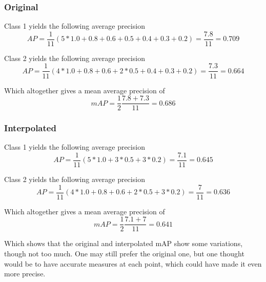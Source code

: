 \subsubsection*{Original}

Class 1 yields the following average precision
\begin{equation*}
    AP = \frac{1}{11}(5*1.0+0.8+0.6+0.5+0.4+0.3+0.2) = \frac{7.8}{11} = 0.709
\end{equation*}

Class 2 yields the following average precision
\begin{equation*}
    AP = \frac{1}{11}(4*1.0+0.8+0.6+2*0.5+0.4+0.3+0.2) = \frac{7.3}{11} = 0.664
\end{equation*}

Which altogether gives a mean average precision of
\begin{equation*}
    mAP = \frac{1}{2}\frac{7.8+7.3}{11} = 0.686
\end{equation*}

\subsubsection*{Interpolated}

Class 1 yields the following average precision
\begin{equation*}
    AP = \frac{1}{11}(5*1.0+3*0.5+3*0.2) = \frac{7.1}{11} = 0.645
\end{equation*}

Class 2 yields the following average precision
\begin{equation*}
    AP = \frac{1}{11}(4*1.0+0.8+0.6+2*0.5+3*0.2) = \frac{7}{11} = 0.636
\end{equation*}

Which altogether gives a mean average precision of
\begin{equation*}
    mAP = \frac{1}{2}\frac{7.1+7}{11} = 0.641
\end{equation*}

Which shows that the original and interpolated mAP show some variations, though not too much.
One may still prefer the original one, but one thought would be to have accurate measures at each point, which could have made it even more precise.










